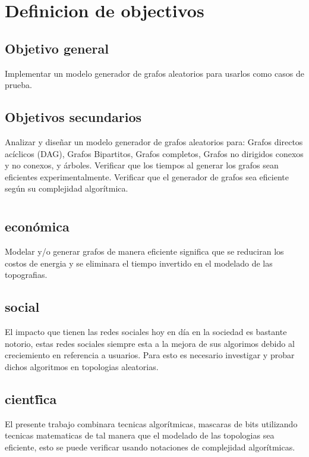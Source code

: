\documentclass[11pt]{extarticle}
\begin{document}
\section{Definicion de objectivos}
  \subsection{Objetivo general}
  Implementar un modelo generador de grafos aleatorios para usarlos como casos de prueba.
  \subsection{Objetivos secundarios}
      \begin{itemize}
        \guion Analizar y diseñar un modelo generador de grafos aleatorios para: Grafos directos acíclicos (DAG), Grafos Bipartitos, Grafos completos, Grafos no dirigidos conexos y no conexos, y árboles.
        \guion Verificar que los tiempos al generar los grafos sean eficientes experimentalmente.
        \guion Verificar que el generador de grafos sea eficiente según su complejidad algorítmica.
      \end{itemize}
\section{\justificacion}
  \subsection{\justificacion econ\'omica}
    Modelar y/o generar grafos de manera eficiente significa que se reduciran los costos de energia y se
    eliminara el tiempo invertido en el modelado de las topografias. 
  \subsection{\justificacion social}
    El impacto que tienen las redes sociales hoy en d\'ia en la sociedad es bastante notorio,
    estas redes sociales siempre esta a la mejora de sus algorimos debido al creciemiento en referencia a usuarios.
    Para esto es necesario investigar y probar dichos algoritmos en topologias aleatorias.
  \subsection{\justificacion cient\'fica}
    El presente trabajo combinara tecnicas algor\'itmicas, mascaras de bits utilizando tecnicas
    matematicas de tal manera que el modelado de las topologias sea eficiente,
    esto se puede verificar usando notaciones de complejidad algor\'itmicas.
\end{document}
